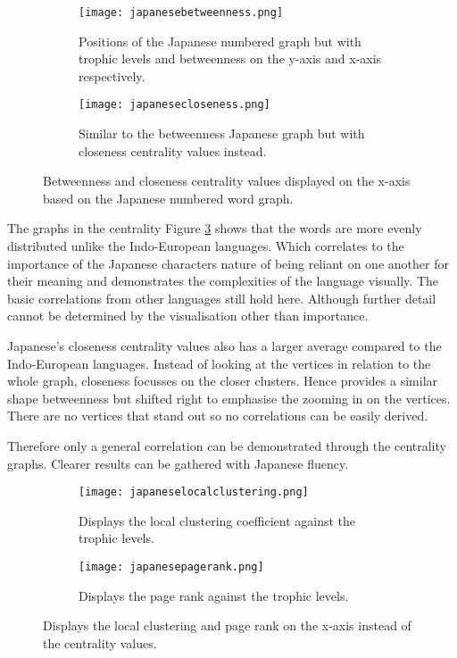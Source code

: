 \begin{figure}[H]
\centering
\begin{subfigure}{.45\textwidth}
	\hspace{-1cm} 
	\texttt{[image: japanesebetweenness.png]}
	\caption{Positions of the Japanese numbered graph but with trophic levels and betweenness on the y-axis and x-axis respectively.}
	\label{fig:jpbc}
\end{subfigure}
\hfill
\begin{subfigure}{.45\textwidth}
	\hspace{-1cm} 
	\texttt{[image: japanesecloseness.png]}
	\caption{Similar to the betweenness Japanese graph but with closeness centrality values instead. }
	\label{fig:jpcc}
\end{subfigure}
\caption{Betweenness and closeness centrality values displayed on the x-axis based on the Japanese numbered word graph.}
\label{fig:jpcentrality}
\end{figure}

The graphs in the centrality Figure \ref{fig:jpcentrality} shows that the words are more evenly distributed unlike the Indo-European languages. Which correlates to the importance of the Japanese characters nature of being reliant on one another for their meaning and demonstrates the complexities of the language visually. The basic correlations from other languages still hold here. Although further detail cannot be determined by the visualisation other than importance.

Japanese's closeness centrality values also has a larger average compared to the Indo-European languages. Instead of looking at the vertices in relation to the whole graph, closeness focusses on the closer clusters. Hence provides a similar shape betweenness but shifted right to emphasise the zooming in on the vertices. There are no vertices that stand out so no correlations can be easily derived.

Therefore only a general correlation can be demonstrated through the centrality graphs. Clearer results can be gathered with Japanese fluency.

\begin{figure}[H]
\centering
\begin{subfigure}{.45\textwidth}
	\hspace{-1cm} 
	\texttt{[image: japaneselocalclustering.png]}
	\caption{Displays the local clustering coefficient against the trophic levels.}
	\label{fig:jplc}
\end{subfigure}
\hfill
\begin{subfigure}{.45\textwidth}
	\hspace{-1cm} 
	\texttt{[image: japanesepagerank.png]}
	\caption{Displays the page rank against the trophic levels.}
	\label{fig:jppr}
\end{subfigure}
\caption{Displays the local clustering and page rank on the x-axis instead of the centrality values.}
\label{fig:jpother}
\end{figure}

